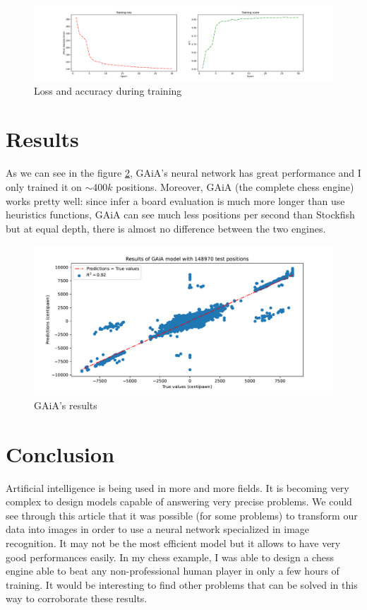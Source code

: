 \documentclass[a4paper]{article}
\begin{document}
\begin{figure}[!]
  \centering
  \includegraphics[width=15cm]{GAiA_history.pdf}
  \caption{Loss and accuracy during training}
  \label{fig:history}
\end{figure}

\section{Results}
As we can see in the figure \ref{fig:result}, GAiA's neural network
has great performance and I only trained it on $\sim 400k$ positions.
Moreover, GAiA (the complete chess engine) works pretty well:
since infer a board evaluation is much more longer than use heuristics functions,
GAiA can see much less positions per second than Stockfish but at equal depth,
there is almost no difference between the two engines.

\begin{figure}[!]
  \centering
  \includegraphics[width=13cm]{result.pdf}
  \caption{GAiA's results}
  \label{fig:result}
\end{figure}

\section{Conclusion}
Artificial intelligence is being used in more and more fields.
It is becoming very complex to design models capable of answering very precise problems.
We could see through this article that it was possible (for some problems) to transform
our data into images in order to use a neural network specialized in image recognition.
It may not be the most efficient model but it allows to have very good performances easily.
In my chess example, I was able to design a chess engine able to beat any non-professional
human player in only a few hours of training. It would be interesting to find other problems
that can be solved in this way to corroborate these results.
\pagebreak


\end{document}
